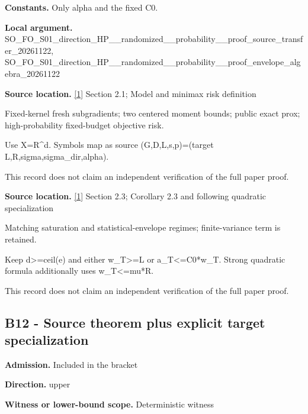 \documentclass[10pt,a4paper]{article}
\begin{document}
\textbf{Constants.} Only alpha and the fixed C0.



\textbf{Local argument.} SO\_FO\_S01\_direction\_HP\_\_\allowbreak{}randomized\_\_probability\_\allowbreak{}\_proof\_source\_transfer\_2\allowbreak{}0261122, SO\_FO\_S01\_direction\_HP\_\_\allowbreak{}randomized\_\_probability\_\allowbreak{}\_proof\_envelope\_algebra\_\allowbreak{}20261122



\textbf{Source location.} \href{https://arxiv.org/html/2610.00260v2}{[1]} Section 2.1; Model and minimax risk definition



Fixed-kernel fresh subgradients; two centered moment bounds; public exact prox; high-probability fixed-budget objective risk.



Use X=R\textasciicircum{}d. Symbols map as source (G,D,L,s,p)=(target L,R,sigma,sigma\_dir,alpha).



This record does not claim an independent verification of the full paper proof.



\textbf{Source location.} \href{https://arxiv.org/html/2610.00260v2}{[1]} Section 2.3; Corollary 2.3 and following quadratic specialization



Matching saturation and statistical-envelope regimes; finite-variance term is retained.



Keep d>=ceil(e) and either w\_T>=L or a\_T<=C0*w\_T. Strong quadratic formula additionally uses w\_T<=mu*R.



This record does not claim an independent verification of the full paper proof.



\subsection{B12 - Source theorem plus explicit target specialization}


\textbf{Admission.} Included in the bracket



\textbf{Direction.} upper



\textbf{Witness or lower-bound scope.} Deterministic witness
\end{document}
